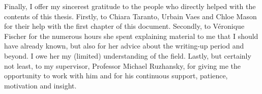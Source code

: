 Finally, I offer my sincerest gratitude to the people who directly helped with the contents of this thesis.
Firstly, to Chiara Taranto, Urbain Vaes and Chloe Mason
for their help with the first chapter of this document.
Secondly, to V\'eronique Fischer for the numerous hours she spent
explaining material to me that I should have already known,
but also for her advice about the writing-up period and beyond.
I owe her my (limited) understanding of the field.
Lastly, but certainly not least,
to my supervisor,
Professor Michael Ruzhansky,
for giving me the opportunity to work with him and for his continuous support, patience, motivation and insight.
